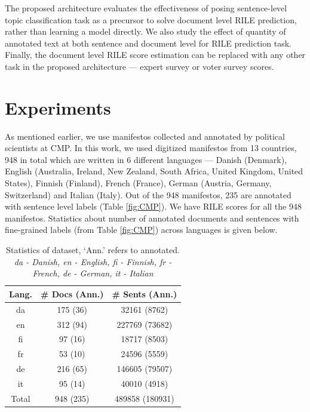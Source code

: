 \documentclass[11pt,a4paper]{article}
\begin{document}

The proposed architecture evaluates the effectiveness of posing sentence-level topic classification task as a precursor to solve document level RILE prediction, rather than learning a model directly.  We also study the effect of quantity of annotated text at both sentence and document level for RILE prediction task. Finally, the document level RILE score estimation can be replaced with any other task in the proposed architecture --- expert survey or voter survey scores.


\section{Experiments}
As mentioned earlier, we use manifestos collected and annotated by political scientists at CMP. In this work, we used digitized manifestos from 13 countries, 948 in total which are written in 6 different languages --- Danish (Denmark), English (Australia, Ireland, New Zealand, South Africa, United Kingdom, United States), Finnish (Finland), French (France), German (Austria, Germany, Switzerland) and Italian (Italy). Out of the 948 manifestos, 235 are annotated with sentence level labels (Table \ref{fig:CMP}). We have RILE scores for all the 948 manifestos. Statistics about number of annotated documents and sentences with fine-grained labels (from Table \ref{fig:CMP}) across languages is given below.
 \begin{table}[!htp]
  \centering
  \begin{tabular}{ c c c }
  \toprule
    Lang. & \# Docs (Ann.) & \# Sents (Ann.)\\
    \midrule
    da  & 175 (36)  &  32161 (8762)	\\
    en   &  312 (94)& 227769 (73682) 	 \\    	
    fi  &  97 (16) &  18717 (8503) \\
    fr    & 53 (10) & 24596 (5559)\\
    de    & 216 (65) & 146605 (79507) \\
    it    & 95 (14)  & 40010 (4918)\\
\midrule
 Total    & 948 (235)  & 489858 (180931)\\
    \bottomrule

  \end{tabular}
  \caption{Statistics of dataset, `Ann.' refers to annotated. \textit{da - Danish, en - English, fi - Finnish, fr - French, de - German, it - Italian}}
  \label{tab:al}
\end{table}
\end{document}
